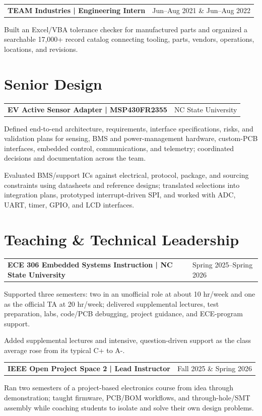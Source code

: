 \documentclass[10pt,letterpaper]{article}
\makeatletter
\newcommand{\resumeentry}[2]{%
  \begin{tabularx}{\textwidth}{@{}X>{\raggedleft\arraybackslash}p{2.40in}@{}}
    \textbf{#1} & #2
  \end{tabularx}\vspace{-0.075cm}
}
\makeatother
\begin{document}
\resumeentry{TEAM Industries | Engineering Intern}{Jun--Aug 2021 \& Jun--Aug 2022}
\begin{resumebullets}
  \item Built an Excel/VBA tolerance checker for manufactured parts and organized a searchable 17,000+ record catalog connecting tooling, parts, vendors, operations, locations, and revisions.
\end{resumebullets}

\section{Senior Design}
\resumeentry{EV Active Sensor Adapter | MSP430FR2355}{NC State University}
\begin{resumebullets}
  \item Defined end-to-end architecture, requirements, interface specifications, risks, and validation plans for sensing, BMS and power-management hardware, custom-PCB interfaces, embedded control, communications, and telemetry; coordinated decisions and documentation across the team.
  \item Evaluated BMS/support ICs against electrical, protocol, package, and sourcing constraints using datasheets and reference designs; translated selections into integration plans, prototyped interrupt-driven SPI, and worked with ADC, UART, timer, GPIO, and LCD interfaces.
\end{resumebullets}

\section{Teaching \& Technical Leadership}
\resumeentry{ECE 306 Embedded Systems Instruction | NC State University}{Spring 2025--Spring 2026}
\begin{resumebullets}
  \item Supported three semesters: two in an unofficial role at about 10 hr/week and one as the official TA at 20 hr/week; delivered supplemental lectures, test preparation, labs, code/PCB debugging, project guidance, and ECE-program support.
  \item Added supplemental lectures and intensive, question-driven support as the class average rose from its typical C+ to A-.
\end{resumebullets}

\resumeentry{IEEE Open Project Space 2 | Lead Instructor}{Fall 2025 \& Spring 2026}
\begin{resumebullets}
  \item Ran two semesters of a project-based electronics course from idea through demonstration; taught firmware, PCB/BOM workflows, and through-hole/SMT assembly while coaching students to isolate and solve their own design problems.
\end{resumebullets}
\end{document}
